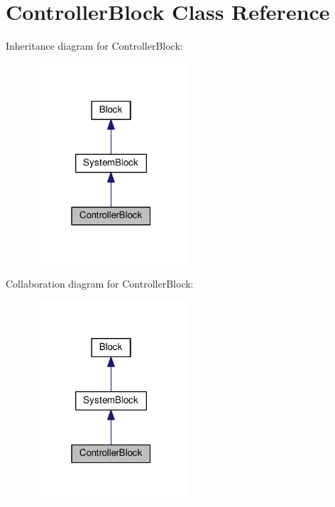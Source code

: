 \hypertarget{classControllerBlock}{}\section{Controller\+Block Class Reference}
\label{classControllerBlock}


Inheritance diagram for Controller\+Block\+:
\nopagebreak
\begin{figure}[H]
\begin{center}
\leavevmode
\includegraphics[width=163pt]{classControllerBlock__inherit__graph}
\end{center}
\end{figure}


Collaboration diagram for Controller\+Block\+:
\nopagebreak
\begin{figure}[H]
\begin{center}
\leavevmode
\includegraphics[width=163pt]{classControllerBlock__coll__graph}
\end{center}
\end{figure}

